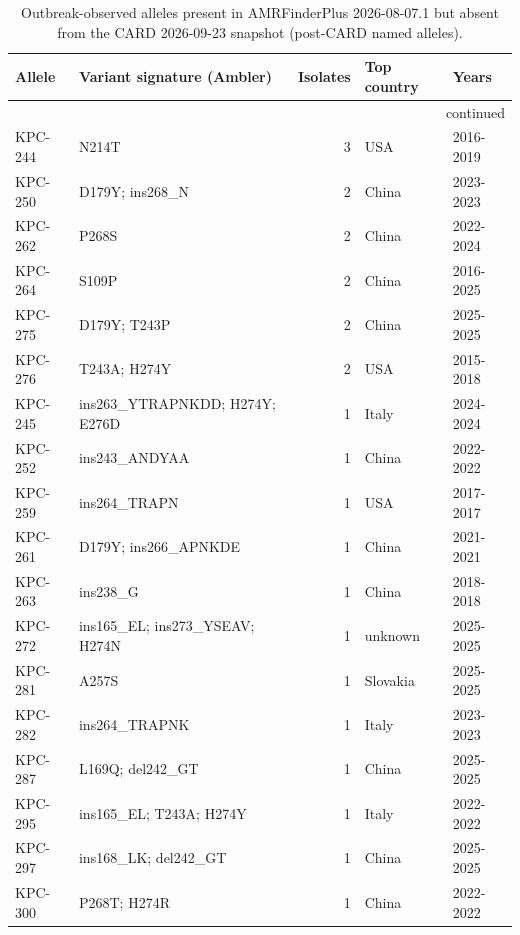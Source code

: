 \footnotesize\begin{longtable}{@{}l p{5.6cm} r l l@{}}
\caption{Outbreak-observed alleles present in AMRFinderPlus 2026-08-07.1 but absent from the CARD 2026-09-23 snapshot (post-CARD named alleles).}\\
\hline Allele & Variant signature (Ambler) & Isolates & Top country & Years \\\hline\endhead
\hline\multicolumn{5}{r}{continued}\\\endfoot
\hline\endlastfoot
KPC-244 & N214T & 3 & USA & 2016-2019 \\
KPC-250 & D179Y; ins268\_N & 2 & China & 2023-2023 \\
KPC-262 & P268S & 2 & China & 2022-2024 \\
KPC-264 & S109P & 2 & China & 2016-2025 \\
KPC-275 & D179Y; T243P & 2 & China & 2025-2025 \\
KPC-276 & T243A; H274Y & 2 & USA & 2015-2018 \\
KPC-245 & ins263\_YTRAPNKDD; H274Y; E276D & 1 & Italy & 2024-2024 \\
KPC-252 & ins243\_ANDYAA & 1 & China & 2022-2022 \\
KPC-259 & ins264\_TRAPN & 1 & USA & 2017-2017 \\
KPC-261 & D179Y; ins266\_APNKDE & 1 & China & 2021-2021 \\
KPC-263 & ins238\_G & 1 & China & 2018-2018 \\
KPC-272 & ins165\_EL; ins273\_YSEAV; H274N & 1 & unknown & 2025-2025 \\
KPC-281 & A257S & 1 & Slovakia & 2025-2025 \\
KPC-282 & ins264\_TRAPNK & 1 & Italy & 2023-2023 \\
KPC-287 & L169Q; del242\_GT & 1 & China & 2025-2025 \\
KPC-295 & ins165\_EL; T243A; H274Y & 1 & Italy & 2022-2022 \\
KPC-297 & ins168\_LK; del242\_GT & 1 & China & 2025-2025 \\
KPC-300 & P268T; H274R & 1 & China & 2022-2022 \\
\end{longtable}
